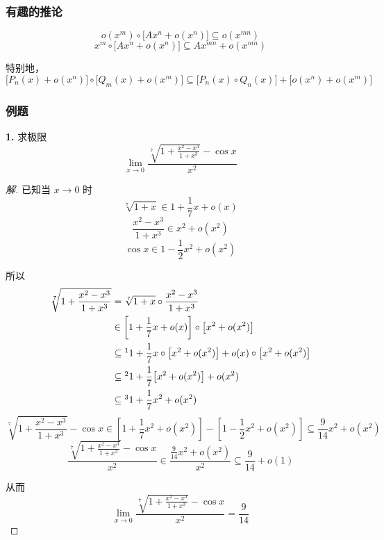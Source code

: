 \subsubsection{有趣的推论}
\begin{theorem}
    \[o(x^m) \circ \bigl[Ax^n + o(x^n)\bigr] \subseteq o(x^{mn}) \tag{1}\]
    \[x^m \circ \bigl[Ax^n + o(x^n)\bigr] \subseteq Ax^{mn} + o(x^{mn}) \tag{2}\]
    
    特别地，
    \[\bigl[P_n(x) + o(x^n)\bigr] \circ \bigl[Q_m(x) + o(x^m)\bigr] \subseteq \big[P_n(x) \circ Q_n(x)\big] + \big[o(x^n) + o(x^m)\big] \tag{3}\]
\end{theorem}

\subsubsection{例题}
\textbf{1.} 求极限
\[\lim_{x \rightarrow 0} \frac{\displaystyle \sqrt[7]{1 + \frac{x^2 - x^3}{1 + x^3}} - \cos x}{x^2}\]
\begin{proof}[解]
    已知当 $x \rightarrow 0$ 时
    \[\sqrt[7]{1 + x} \in 1 + \frac{1}{7}x + o(x)\]
    \[\frac{x^2-x^3}{1+x^3} \in x^2 + o(x^2)\]
    \[\cos x \in 1 - \frac{1}{2}x^2 + o(x^2)\]

    所以
    \begin{align*}
        \sqrt[7]{1 + \frac{x^2 - x^3}{1 + x^3}} &= \sqrt[7]{1 + x} \circ \frac{x^2-x^3}{1+x^3}\\
        &\in \left[1 + \frac{1}{7}x + o(x)\right] \circ \big[x^2 + o(x^2)\big]\\
        &\subseteq\footnotemark 1 + \frac{1}{7} x \circ \big[x^2 + o(x^2)\big] + o(x) \circ \big[x^2 + o(x^2)\big]\\
        &\subseteq\footnotemark 1 + \frac{1}{7}\big[x^2 + o(x^2)\big] + o(x^2)\\
        &\subseteq\footnotemark 1 + \frac{1}{7}x^2 + o(x^2)
    \end{align*}
    \[\sqrt[7]{1 + \frac{x^2 - x^3}{1 + x^3}} - \cos x \in \left[1 + \frac{1}{7}x^2 + o(x^2)\right] - \left[1 - \frac{1}{2}x^2 + o(x^2)\right] \subseteq \frac{9}{14}x^2 + o(x^2)\]
    \[\frac{\displaystyle \sqrt[7]{1 + \frac{x^2 - x^3}{1 + x^3}} - \cos x}{x^2} \in \frac{\displaystyle \frac{9}{14}x^2 + o(x^2)}{x^2} \subseteq \frac{9}{14} + o(1)\]

    从而
    \[\lim_{x \rightarrow 0} \frac{\displaystyle \sqrt[7]{1 + \frac{x^2 - x^3}{1 + x^3}} - \cos x}{x^2} = \frac{9}{14}\]
\end{proof}
